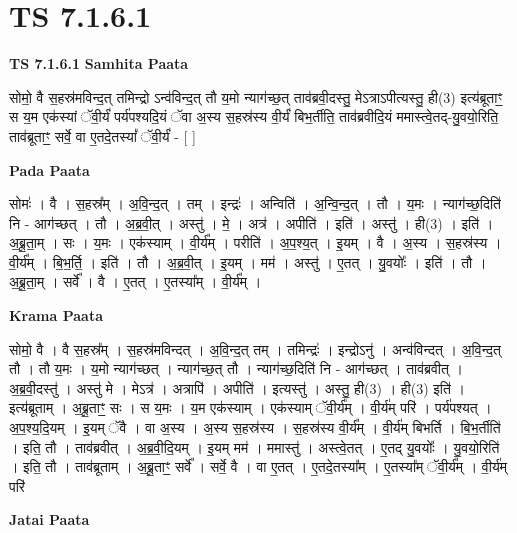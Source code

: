 \documentclass[17pt]{extarticle}
\begin{document}
\section{ TS 7.1.6.1 }

\textbf{TS 7.1.6.1 } \newline
\textbf{Samhita Paata} \newline

सोमो॒ वै स॒हस्र॑मविन्द॒त् तमिन्द्रो ऽन्व॑विन्द॒त् तौ य॒मो न्याग॑च्छ॒त् ताव॑ब्रवी॒दस्तु॒ मेऽत्राऽपीत्यस्तु॒ ही(3) इत्य॑ब्रूताꣳ॒॒ स य॒म एक॑स्यां ॅवी॒र्यं॑ पर्य॑पश्यदि॒यं ॅवा अ॒स्य स॒हस्र॑स्य वी॒र्यं॑ बिभ॒र्तीति॒ ताव॑ब्रवीदि॒यं ममास्त्वे॒तद्-यु॒वयो॒रिति॒ ताव॑ब्रूताꣳ॒॒ सर्वे॒ वा ए॒तदे॒तस्यां᳚ ॅवी॒र्यं॑ - [  ] \newline

\textbf{Pada Paata} \newline

सोमः॑ । वै । स॒हस्र᳚म् । अ॒वि॒न्द॒त् । तम् । इन्द्रः॑ । अन्विति॑ । अ॒न्वि॒न्द॒त् । तौ । य॒मः । न्याग॑च्छ॒दिति॑ नि - आग॑च्छत् । तौ । अ॒ब्र॒वी॒त् । अस्तु॑ । मे॒ । अत्र॑ । अपीति॑ । इति॑ । अस्तु॑ । ही(3) । इति॑ । अ॒ब्रू॒ता॒म् । सः । य॒मः । एक॑स्याम् । वी॒र्य᳚म् । परीति॑ । अ॒प॒श्य॒त् । इ॒यम् । वै । अ॒स्य । स॒हस्र॑स्य । वी॒र्य᳚म् । बि॒भ॒र्ति॒ । इति॑ । तौ । अ॒ब्र॒वी॒त् । इ॒यम् । मम॑ । अस्तु॑ । ए॒तत् । यु॒वयोः᳚ । इति॑ । तौ । अ॒ब्रू॒ता॒म् । सर्वे᳚ । वै । ए॒तत् । ए॒तस्या᳚म् । वी॒र्य᳚म् ।  \newline


\textbf{Krama Paata} \newline

सोमो॒ वै । वै स॒हस्र᳚म् । स॒हस्र॑मविन्दत् । अ॒वि॒न्द॒त् तम् । तमिन्द्रः॑ । इन्द्रोऽनु॑ । अन्व॑विन्दत् । अ॒वि॒न्द॒त् तौ । तौ य॒मः । य॒मो न्याग॑च्छत् । न्याग॑च्छ॒त् तौ । न्याग॑च्छ॒दिति॑ नि - आग॑च्छत् । ताव॑ब्रवीत् । अ॒ब्र॒वी॒दस्तु॑ । अस्तु॑ मे । मेऽत्र॑ । अत्रापि॑ । अपीति॑ । इत्यस्तु॑ । अस्तु॒ ही(3) । ही(3) इति॑ । इत्य॑ब्रूताम् । अ॒ब्रू॒ताꣳ॒॒ सः । स य॒मः । य॒म एक॑स्याम् । एक॑स्याम् ॅवी॒र्य᳚म् । वी॒र्य॑म् परि॑ । पर्य॑पश्यत् । अ॒प॒श्य॒दि॒यम् । इ॒यम् ॅवै । वा अ॒स्य । अ॒स्य स॒हस्र॑स्य । स॒हस्र॑स्य वी॒र्य᳚म् । वी॒र्य॑म् बिभर्ति । बि॒भ॒र्तीति॑ । इति॒ तौ । ताव॑ब्रवीत् । अ॒ब्र॒वी॒दि॒यम् । इ॒यम् मम॑ । ममास्तु॑ । अस्त्वे॒तत् । ए॒तद् यु॒वयोः᳚ । यु॒वयो॒रिति॑ । इति॒ तौ । ताव॑ब्रूताम् । अ॒ब्रू॒ताꣳ॒॒ सर्वे᳚ । सर्वे॒ वै । वा ए॒तत् । ए॒तदे॒तस्या᳚म् । ए॒तस्या᳚म् ॅवी॒र्य᳚म् । वी॒र्य॑म् परि॑ \newline

\textbf{Jatai Paata} \newline
\end{document}
